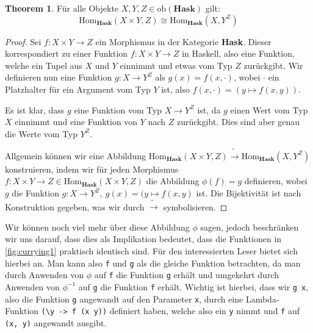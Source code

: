 \documentclass{hhuarticle}
\theoremstyle{definition}
\theoremstyle{theorem}
\newtheorem{theorem}{Theorem}[section]
\begin{document}
  \begin{theorem}
    Für alle Objekte $X, Y, Z \in \text{ob}(\textbf{Hask})$ gilt:
    \begin{equation}
      \text{Hom}_\textbf{Hask}(X \times Y, Z) \cong \text{Hom}_\textbf{Hask}(X, Y^Z)
    \end{equation}
  \end{theorem}

  \begin{proof}
    Sei $f: X \times Y \to Z$ ein Morphismus in der Kategorie \textbf{Hask}.
    Dieser korrespondiert zu einer Funktion $f: X \times Y \to Z$ in Haskell,
    also eine Funktion, welche ein Tupel aus $X$ und $Y$ einnimmt und etwas
    vom Typ $Z$ zurückgibt. Wir definieren nun eine Funktion
    $g: X \to Y^Z$ als $g(x) = f(x, \cdot)$, wobei $\cdot$ ein Platzhalter
    für ein Argument vom Typ $Y$ ist, also
    $f(x, \cdot) = (y \mapsto f(x, y))$.

    Es ist klar, dass $g$ eine Funktion vom Typ $X \to Y^Z$ ist, da
    $g$ einen Wert vom Typ $X$ einnimmt und eine Funktion von $Y$ nach $Z$
    zurückgibt. Dies sind aber genau die Werte vom Typ $Y^Z$.

    Allgemein können wir eine Abbildung
    $\text{Hom}_\textbf{Hask}(X \times Y, Z) \tilde\to \text{Hom}_\textbf{Hask}(X, Y^Z)$
    konstruieren, indem wir für jeden Morphismus $f: X \times Y \to Z \in \text{Hom}_\textbf{Hask}(X \times Y, Z)$
    die Abbildung $\phi(f) = g$ definieren, wobei $g$ die Funktion
    $g: X \to Y^Z, \> g(x) = (y \mapsto f(x,y)$ ist. Die Bijektivität
    ist nach Konstruktion gegeben, was wir durch $\tilde \to$ symbolisieren.
  \end{proof}

  Wir können noch viel mehr über diese Abbildung $\phi$ sagen, jedoch
  beschränken wir uns darauf, dass dies als Implikation bedeutet, dass
  die Funktionen in \cref{fig:currying1} praktisch identisch sind.
  Für den interessierten Leser bietet sich hierbei \cite[S. 53, Proposition 3.3.2]{CATEGORIES_TYPES_AND_STRUCTURES} an.
  Man kann also \verb|f| und \verb|g| als die gleiche Funktion
  betrachten, da man durch Anwenden von $\phi$ auf \verb|f| die Funktion
  \verb|g| erhält und umgekehrt durch Anwenden von $\phi^{-1}$ auf \verb|g|
  die Funktion \verb|f| erhält. Wichtig ist hierbei,
  dass wir \verb|g x|, also die Funktion \verb|g| angewandt auf
  den Parameter \verb|x|, durch eine Lambda-Funktion
  \verb|(\y -> f (x y))| definiert haben, welche also ein \verb|y| nimmt
  und \verb|f| auf \verb|(x, y)| angewandt ausgibt.
\end{document}
